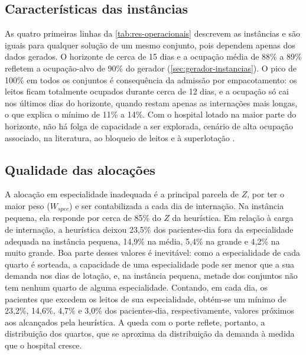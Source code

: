 \subsection{Características das instâncias}

As quatro primeiras linhas da \autoref{tab:res-operacionais} descrevem as instâncias e são iguais para qualquer solução de um mesmo conjunto, pois dependem apenas dos dados gerados. O horizonte de cerca de 15 dias e a ocupação média de 88\% a 89\% refletem a ocupação-alvo de 90\% do gerador (\autoref{sec:gerador-instancias}). O pico de 100\% em todos os conjuntos é consequência da admissão por empacotamento: os leitos ficam totalmente ocupados durante cerca de 12 dias, e a ocupação só cai nos últimos dias do horizonte, quando restam apenas as internações mais longas, o que explica o mínimo de 11\% a 14\%. Com o hospital lotado na maior parte do horizonte, não há folga de capacidade a ser explorada, cenário de alta ocupação associado, na literatura, ao bloqueio de leitos e à superlotação \cite{brandeau2004operations, he2019systematic}.

\subsection{Qualidade das alocações}

A alocação em especialidade inadequada é a principal parcela de $Z$, por ter o maior peso ($W_{spec}$) e ser contabilizada a cada dia de internação. Na instância pequena, ela responde por cerca de 85\% do $Z$ da heurística. Em relação à carga de internação, a heurística deixou 23,5\% dos pacientes-dia fora da especialidade adequada na instância pequena, 14,9\% na média, 5,4\% na grande e 4,2\% na muito grande. Boa parte desses valores é inevitável: como a especialidade de cada quarto é sorteada, a capacidade de uma especialidade pode ser menor que a sua demanda nos dias de lotação, e, na instância pequena, metade dos conjuntos não tem nenhum quarto de alguma especialidade. Contando, em cada dia, os pacientes que excedem os leitos de sua especialidade, obtém-se um mínimo de 23,2\%, 14,6\%, 4,7\% e 3,0\% dos pacientes-dia, respectivamente, valores próximos aos alcançados pela heurística. A queda com o porte reflete, portanto, a distribuição dos quartos, que se aproxima da distribuição da demanda à medida que o hospital cresce.


